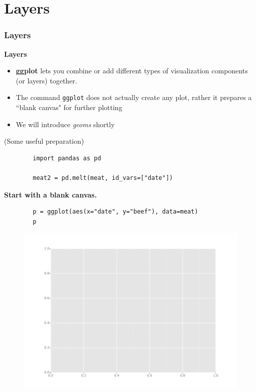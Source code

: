 \documentclass{beamer}
\begin{document}
\section{Layers}
\begin{frame}[fragile]
	\frametitle{Layers}
	\Large
	\noindent \textbf{Layers}
	\begin{itemize}
		\item \textbf{ggplot} lets you combine or add different types of visualization components (or layers) together. 
		\item The command \texttt{ggplot} does not actually create any plot, rather it prepares a ``blank canvas" for further plotting 
		\item We will introduce \textit{geoms} shortly
	\end{itemize}
	
\end{frame}
\begin{frame}[fragile]
	\large
	(Some useful preparation)
	\begin{framed}
		\begin{verbatim}
		import pandas as pd
		
		meat2 = pd.melt(meat, id_vars=["date"])
		\end{verbatim}
	\end{framed}
\end{frame}
\begin{frame}[fragile]
\textbf{	Start with a blank canvas.}
	\begin{framed}
		\begin{verbatim}
		p = ggplot(aes(x="date", y="beef"), data=meat)
		p
		\end{verbatim}
	\end{framed}
	\begin{figure}
		\centering
		\includegraphics[width=0.7\linewidth]{Layers1}
	\end{figure}
	
\end{frame}
\end{document}

